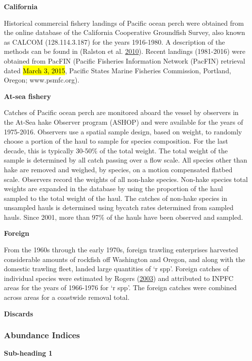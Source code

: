 \documentclass[12pt,]{article}
\begin{document}
\textbf{California}

Historical commercial fishery landings of Pacific ocean perch were
obtained from the online database of the California Cooperative
Groundfish Survey, also known as CALCOM (128.114.3.187) for the years
1916-1980. A description of the methods can be found in (Ralston et al.
\protect\hyperlink{ref-ralston_documentation_2010}{2010}). Recent
landings (1981-2016) were obtained from PacFIN (Pacific Fisheries
Information Network (PacFIN) retrieval dated \hl{March 3, 2015}, Pacific
States Marine Fisheries Commission, Portland, Oregon; www.psmfc.org).

\textbf{At-sea fishery}

Catches of Pacific ocean perch are monitored aboard the vessel by
observers in the At-Sea hake Observer program (ASHOP) and were available
for the years of 1975-2016. Observers use a spatial sample design, based
on weight, to randomly choose a portion of the haul to sample for
species composition. For the last decade, this is typically 30-50\% of
the total weight. The total weight of the sample is determined by all
catch passing over a flow scale. All species other than hake are removed
and weighed, by species, on a motion compensated flatbed scale.
Observers record the weights of all non-hake species. Non-hake species
total weights are expanded in the database by using the proportion of
the haul sampled to the total weight of the haul. The catches of
non-hake species in unsampled hauls is determined using bycatch rates
determined from sampled hauls. Since 2001, more than 97\% of the hauls
have been observed and sampled.

\textbf{Foreign}

From the 1960s through the early 1970s, foreign trawling enterprises
harvested considerable amounts of rockfish off Washington and Oregon,
and along with the domestic trawling fleet, landed large quantities of
`r spp'. Foreign catches of individual species were estimated by Rogers
(\protect\hyperlink{ref-rogers_species_2003}{2003}) and attributed to
INPFC areas for the years of 1966-1976 for `r spp'. The foreign catches
were combined across areas for a coastwide removal total.

\textbf{Discards}

\subsubsection{Abundance Indices}\label{abundance-indices}

\textbf{Sub-heading 1}
\end{document}
